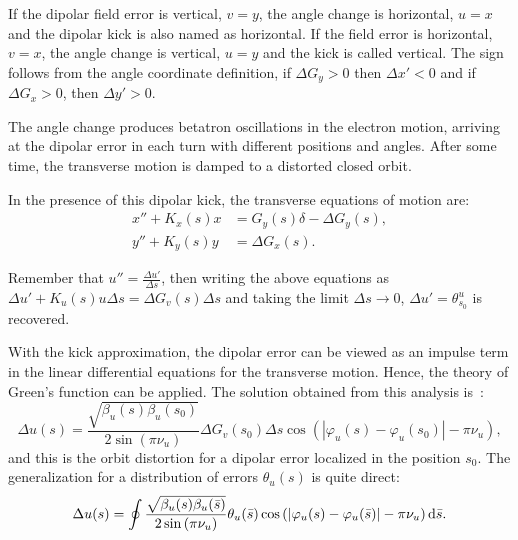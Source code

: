 If the dipolar field error is vertical, $v=y$, the angle change is horizontal, $u=x$ and the dipolar kick is also named as horizontal. If the field error is horizontal, $v=x$, the angle change is vertical, $u=y$ and the kick is called vertical. The sign follows from the angle coordinate definition, if $\Delta G_y > 0$ then $\Delta x' < 0$ and if $\Delta G_x > 0$, then $\Delta y' > 0$.

The angle change produces betatron oscillations in the electron motion, arriving at the dipolar error in each turn with different positions and angles. After some time, the transverse motion is damped to a distorted closed orbit. 

In the presence of this dipolar kick, the transverse equations of motion  are:
\begin{align}
    x'' + K_x(s)x &= G_y(s) \delta - \Delta G_y(s), \\
    y'' + K_y(s)y &= \Delta G_x(s).
\end{align}

Remember that $u'' = \frac{\Delta u'}{\Delta s}$, then writing the above equations as $\Delta u' + K_u(s) u \Delta s = \Delta G_v(s) \Delta s$ and taking the limit $\Delta s \rightarrow 0$, $\Delta u' = \theta^{u}_{s_0}$ is recovered. 

With the kick approximation, the dipolar error can be viewed as an impulse term in the linear differential equations for the transverse motion. Hence, the theory of Green's function can be applied. The solution obtained from this analysis is~\cite{wiedemann2007physics}:
\begin{equation}
    \Delta u(s) = \dfrac{\sqrt{\beta_{u}(s)\beta_{u}(s_0)}}{2\sin\left(\pi\nu_{u}\right)}  \Delta G_v(s_0)\Delta s \cos\left( |\varphi_{u}(s) - \varphi_{u}(s_0)| - \pi\nu_{u} \right),
\end{equation}
and this is the orbit distortion for a dipolar error localized in the position $s_0$. The generalization for a distribution of errors $\theta_u(s)$ is quite direct:
\begin{equation}
    \Delta u(s) = \oint \dfrac{\sqrt{\beta_{u}(s)\beta_{u}(\bar{s})}}{2\sin\left(\pi\nu_{u}\right)} \theta_{u}(\bar{s}) \cos\left( |\varphi_{u}(s) - \varphi_{u}(\bar{s})| - \pi\nu_{u} \right) \mathrm{d} \bar{s}.
    \label{eq:orbit_distortion}
\end{equation}

